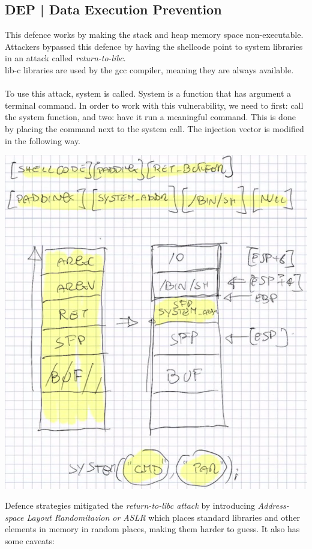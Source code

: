 \documentclass[11pt, oneside]{article}   	%
\begin{document}
\subsection*{DEP | Data Execution Prevention}
This defence works by making the stack and heap memory space non-executable. Attackers bypassed this defence by having the shellcode point to system libraries in an attack called \emph{return-to-libc}.\\ lib-c libraries are used by the gcc compiler, meaning they are always available.\\\\
To use this attack, system is called. System is a function that has argument a terminal command. In order to work with this vulnerability, we need to first: call the system function, and two: have it run a meaningful command. This is done by placing the command next to the system call. The injection vector is modified in the following way.
\begin{center}
\includegraphics[scale = 0.5]{libc}
\end{center}
Defence strategies mitigated the \emph{return-to-libc attack} by introducing \emph{Address-space Layout Randomitazion or ASLR} which places standard libraries and other elements in memory in random places, making them harder to guess. It also has some caveats:
\end{document}
